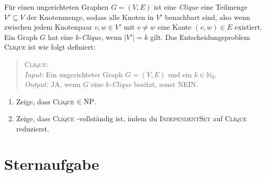 \documentclass{uebung_cs}
\begin{document}
\begin{aufgabe}[Clique]
	Für einen ungerichteten Graphen $G = (V,E)$  ist eine \textit{Clique} eine Teilmenge $V' \subseteq V$ der Knotenmenge, sodass alle Knoten in $V'$ benachbart sind, also wenn zwischen jedem Knotenpaar $v,w \in V'$ mit $v \neq w$ eine Kante $(v,w) \in E$ existiert. Ein Graph $G$ hat eine $k$-\textit{Clique}, wenn $|V'| = k$ gilt. Das Entscheidungsproblem \textsc{Clique} ist wie folgt definiert:
	\begin{quote}
		\textsc{Clique}:\\
		\textit{Input:} Ein ungerichteter Graph $G = (V,E)$ und ein $k \in \mathbb{N}_0$.\\
		\textit{Output:} \glqq JA\grqq{}, wenn $G$ eine $k$-\textit{Clique} besitzt, sonst \glqq NEIN\grqq{}.
	\end{quote}
	\begin{enumerate}
		\item Zeige, dass \textsc{Clique} $\in \mathrm{NP}$.
		\item Zeige, dass \textsc{Clique} \NP-vollständig ist, indem du \textsc{IndependentSet} auf \textsc{Clique} reduzierst.
	\end{enumerate}
\end{aufgabe}

\section*{Sternaufgabe}

\begin{aufgabe}
	
\end{aufgabe}
\end{document}
